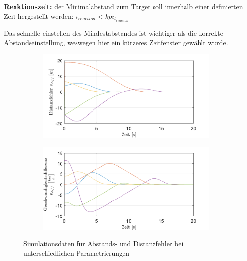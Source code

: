 \medskip\noindent\textbf{Reaktionszeit:} der Minimalabstand zum Target soll innerhalb einer definierten Zeit hergestellt werden: $t_{reaction} < kpi_{t_{reaction}}$

\noindent Das schnelle einstellen des Mindestabstandes ist wichtiger als die korrekte Abstandseinstellung, weswegen hier ein kürzeres Zeitfenster gewählt wurde.
\begin{figure}
    \centering
    \begin{subfigure}[b]{.49\textwidth}
        \centering
        \includegraphics[width=\textwidth]{figures/3_Implementierung/ACC_Vel_Const/ACC_Vel_Const_s-Diff.pdf}
    \end{subfigure}
    \hfill
    \begin{subfigure}[b]{.49\textwidth}
        \centering
        \includegraphics[width=\textwidth]{figures/3_Implementierung/ACC_Vel_Const/ACC_Vel_Const_v-Diff.pdf}
    \end{subfigure}
    \caption{Simulationsdaten für Abstands- und Distanzfehler bei unterschiedlichen Parametrierungen}
    \label{fig:ACC_KPI_s_v}
\end{figure}